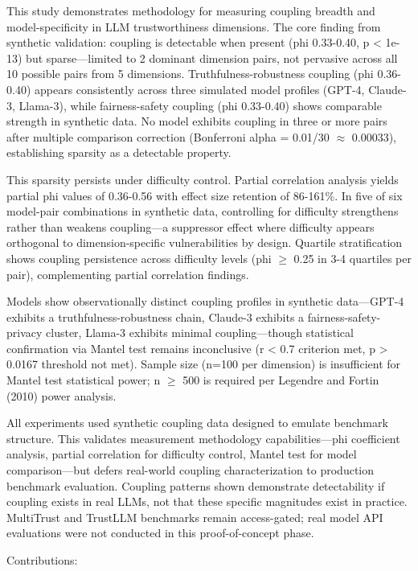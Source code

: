 This study demonstrates methodology for measuring coupling breadth and model-specificity in LLM trustworthiness dimensions. The core finding from synthetic validation: coupling is detectable when present (phi 0.33-0.40, p < 1e-13) but sparse---limited to 2 dominant dimension pairs, not pervasive across all 10 possible pairs from 5 dimensions. Truthfulness-robustness coupling (phi 0.36-0.40) appears consistently across three simulated model profiles (GPT-4, Claude-3, Llama-3), while fairness-safety coupling (phi 0.33-0.40) shows comparable strength in synthetic data. No model exhibits coupling in three or more pairs after multiple comparison correction (Bonferroni alpha = 0.01/30 $\approx$ 0.00033), establishing sparsity as a detectable property.

This sparsity persists under difficulty control. Partial correlation analysis yields partial phi values of 0.36-0.56 with effect size retention of 86-161\%. In five of six model-pair combinations in synthetic data, controlling for difficulty strengthens rather than weakens coupling---a suppressor effect where difficulty appears orthogonal to dimension-specific vulnerabilities by design. Quartile stratification shows coupling persistence across difficulty levels (phi $\geq$ 0.25 in 3-4 quartiles per pair), complementing partial correlation findings.

Models show observationally distinct coupling profiles in synthetic data---GPT-4 exhibits a truthfulness-robustness chain, Claude-3 exhibits a fairness-safety-privacy cluster, Llama-3 exhibits minimal coupling---though statistical confirmation via Mantel test remains inconclusive (r < 0.7 criterion met, p > 0.0167 threshold not met). Sample size (n=100 per dimension) is insufficient for Mantel test statistical power; n $\geq$ 500 is required per Legendre and Fortin (2010) power analysis.

All experiments used synthetic coupling data designed to emulate benchmark structure. This validates measurement methodology capabilities---phi coefficient analysis, partial correlation for difficulty control, Mantel test for model comparison---but defers real-world coupling characterization to production benchmark evaluation. Coupling patterns shown demonstrate detectability if coupling exists in real LLMs, not that these specific magnitudes exist in practice. MultiTrust and TrustLLM benchmarks remain access-gated; real model API evaluations were not conducted in this proof-of-concept phase.

Contributions:

